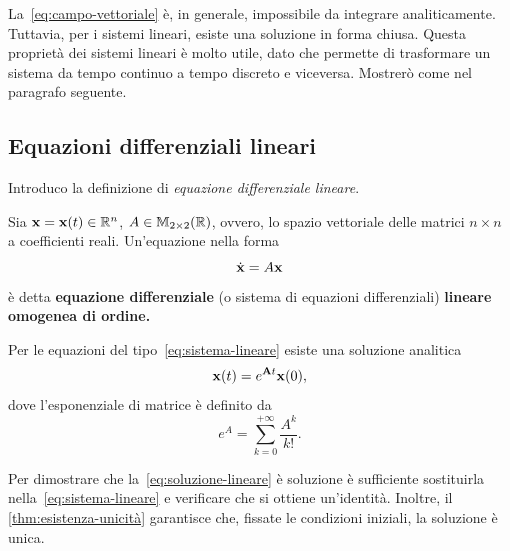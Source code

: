 La~\eqref{eq:campo-vettoriale} è, in generale, impossibile da integrare analiticamente.
Tuttavia, per i sistemi lineari, esiste una soluzione in forma chiusa.
Questa proprietà dei sistemi lineari è molto utile, dato che permette di trasformare un sistema
da tempo continuo a tempo discreto e viceversa.
Mostrerò come nel paragrafo seguente.


\subsection{Equazioni differenziali lineari}
\label{subsec:equazioni-differenziali-lineari}
Introduco la definizione di \emph{equazione differenziale lineare}.
\begin{definition}
    Sia $\mathbf{x} = \mathbf{x}(t) \in \mathbb{R}^n$, $A \in \mathbb{M}_{2\times 2}(\mathbb{R})$, ovvero, lo spazio vettoriale delle
    matrici $n \times n$ a coefficienti reali. Un'equazione nella forma
    \begin{equation}
        \dot{\mathbf{x}} = A \mathbf{x}
        \label{eq:sistema-lineare}
    \end{equation}
    è detta \textbf{equazione differenziale} (o sistema di equazioni differenziali) \textbf{lineare omogenea di  ordine.}
    \label{def:sistema-lineare}
\end{definition}

Per le equazioni del tipo~\eqref{eq:sistema-lineare} esiste una soluzione analitica
\begin{equation}
    \mathbf{x}(t) = e^{\mathbf{A} t} \mathbf{x}(0),
    \label{eq:soluzione-lineare}
\end{equation}
dove l'esponenziale di matrice è definito da
\begin{equation*}
    e^{A} = \sum_{k=0}^{+\infty} \frac{A^k}{k!}.
\end{equation*}

Per dimostrare che la~\eqref{eq:soluzione-lineare} è soluzione è
sufficiente sostituirla nella~\eqref{eq:sistema-lineare} e verificare che
si ottiene un'identità.
Inoltre, il \autoref{thm:esistenza-unicità} garantisce che,
fissate le condizioni iniziali, la
soluzione è unica.

